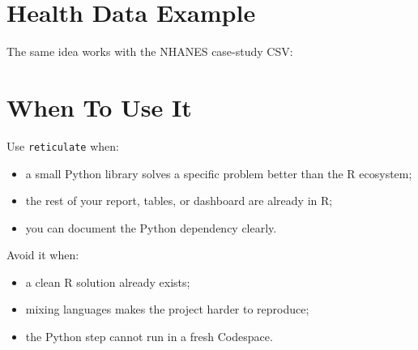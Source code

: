 \documentclass[
  letterpaper,
  DIV=11,
  numbers=noendperiod,
  oneside]{scrreprt}
\newenvironment{Shaded}{\begin{snugshade}}{\end{snugshade}}
\newcommand{\FunctionTok}[1]{\textcolor[rgb]{0.28,0.35,0.67}{#1}}
\newcommand{\NormalTok}[1]{\textcolor[rgb]{0.00,0.23,0.31}{#1}}
\newcommand{\OtherTok}[1]{\textcolor[rgb]{0.00,0.23,0.31}{#1}}
\newcommand{\SpecialCharTok}[1]{\textcolor[rgb]{0.37,0.37,0.37}{#1}}
\newcommand{\StringTok}[1]{\textcolor[rgb]{0.13,0.47,0.30}{#1}}
\providecommand{\tightlist}{%
  \setlength{\itemsep}{0pt}\setlength{\parskip}{0pt}}
\begin{document}
\section{Health Data Example}\label{health-data-example}

The same idea works with the NHANES case-study CSV:

\begin{Shaded}
\end{Shaded}

\section{When To Use It}\label{when-to-use-it}

Use \texttt{reticulate} when:

\begin{itemize}
\tightlist
\item
  a small Python library solves a specific problem better than the R
  ecosystem;
\item
  the rest of your report, tables, or dashboard are already in R;
\item
  you can document the Python dependency clearly.
\end{itemize}

Avoid it when:

\begin{itemize}
\tightlist
\item
  a clean R solution already exists;
\item
  mixing languages makes the project harder to reproduce;
\item
  the Python step cannot run in a fresh Codespace.
\end{itemize}
\end{document}
